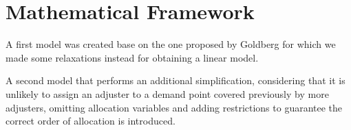 \section{Mathematical Framework}

A first model was created
base on the one proposed by Goldberg \cite{goldberg1990validating}
for which
we made some relaxations
instead for obtaining a linear model.

A second model
that performs an additional simplification,
considering that
it is unlikely
to assign an adjuster
to a demand point
covered previously
by more adjusters,
omitting allocation variables
and adding restrictions
to guarantee
the correct order of allocation is introduced.
